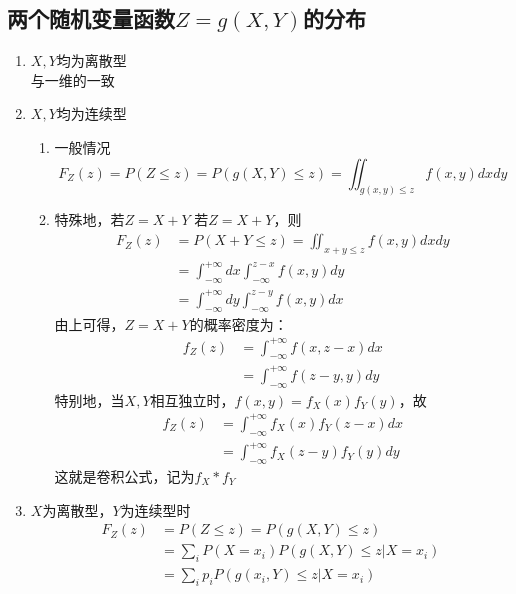 \subsection{两个随机变量函数$Z=g(X,Y)$的分布}
\begin{enumerate}
	\item $X,Y$均为离散型 \\
	与一维的一致
	\item $X,Y$均为连续型 \\ 
	\begin{enumerate}
		\item 一般情况
		\begin{equation}
			F_Z(z) = P(Z \leq z) = P(g(X,Y) \leq z) = \iint_{g(x,y)\leq z} f(x,y)dxdy
		\end{equation}
		\item 特殊地，若$Z=X+Y$
		若$Z=X+Y$，则
		\begin{align}
			F_Z(z) &= P(X+Y\leq z) = \iint_{x+y \leq z} f(x,y)dxdy \\
			&= \int_{-\infty}^{+\infty}dx\int_{-\infty}^{z-x}f(x,y)dy \\
			&= \int_{-\infty}^{+\infty}dy\int_{-\infty}^{z-y}f(x,y)dx
		\end{align}
		由上可得，$Z=X+Y$的概率密度为：
		\begin{align}
			f_Z(z) &= \int_{-\infty}^{+\infty}f(x, z-x)dx \\
			&= \int_{-\infty}^{+\infty}f(z-y, y)dy
		\end{align}
		特别地，当$X, Y$相互独立时，$f(x,y) = f_X(x)f_Y(y)$，故
		\begin{align}
			f_Z(z) &= \int_{-\infty}^{+\infty}f_X(x)f_Y(z-x)dx \\
			&= \int_{-\infty}^{+\infty} f_X(z-y)f_Y(y)dy
		\end{align}
		这就是卷积公式，记为$f_X * f_Y$
	\end{enumerate}
	\item $X$为离散型，$Y$为连续型时
	\begin{align}
		F_Z(z) &= P(Z\leq z) = P(g(X,Y)\leq z) \\
		&= \sum_iP(X=x_i)P(g(X,Y)\leq z|X=x_i) \\
		&= \sum_ip_iP(g(x_i, Y)\leq z | X=x_i)
	\end{align}
\end{enumerate}













